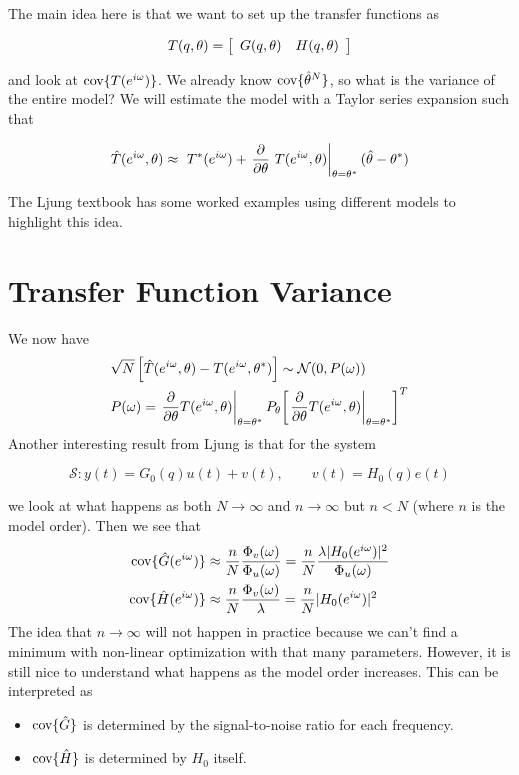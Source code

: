 The main idea here is that we want to set up the transfer functions as

\begin{equation*}
T(q,\theta) = \left[\begin{array}{c c} G(q,\theta) & H(q,\theta) \end{array}\right]
\end{equation*}

and look at $\text{cov}\{T (e^{i\omega})\}$.
We already know $\text{cov}\{\hat{\theta}^N\}$, so what is the variance of the entire model? We will estimate the model with a Taylor series expansion such that

\begin{equation*}
\hat{T} (e^{i\omega},\theta) \approx~T^\ast(e^{i\omega}) + \left.\frac{\partial}{\partial\theta}~T (e^{i\omega},\theta)\right|_{\theta=\theta^\ast} (\hat{\theta}-\theta^\ast)
\end{equation*}

The Ljung textbook has some worked examples using different models to highlight this idea.

\section{Transfer Function Variance}
We now have
\begin{align*}
&\sqrt{N}\left[\hat{T}(e^{i\omega},\theta) - T(e^{i\omega},\theta^\ast)\right] \sim \mathcal{N}(0,P(\omega)) \\
&P(\omega) = \left.\frac{\partial}{\partial\theta} T(e^{i\omega},\theta)\right|_{\theta=\theta^\ast} P_\theta {\left[\left.\frac{\partial}{\partial\theta}T(e^{i\omega},\theta)\right|_{\theta=\theta^\ast}\right]}^T
\end{align*}
Another interesting result from Ljung is that for the system

\begin{equation*}
\mathcal{S}: y(t) = G_0(q)u(t)+v(t), \qquad v(t) = H_0(q)e(t)
\end{equation*}

we look at what happens as both $N\to\infty$ and $n\to\infty$ but $n<N$ (where $n$ is the model order).
Then we see that
\begin{align*}
\text{cov}\{\hat{G}(e^{i\omega})\} &\approx \frac{n}{N}\frac{\Phi_v(\omega)}{\Phi_u(\omega)} = \frac{n}{N}\frac{\lambda|H_0(e^{i\omega})|^2}{\Phi_u(\omega)} \\
\text{cov}\{\hat{H}(e^{i\omega})\} &\approx \frac{n}{N}\frac{\Phi_v(\omega)}{\lambda} = \frac{n}{N}|H_0(e^{i\omega})|^2
\end{align*}
The idea that $n\to\infty$ will not happen in practice because we can't find a minimum with non-linear optimization with that many parameters.
However, it is still nice to understand what happens as the model order increases.
This can be interpreted as
\begin{itemize}
\item $\text{cov}\{\hat{G}\}$ is determined by the signal-to-noise ratio for each frequency.
\item $\text{cov}\{\hat{H}\}$ is determined by $H_0$ itself.
\end{itemize}

